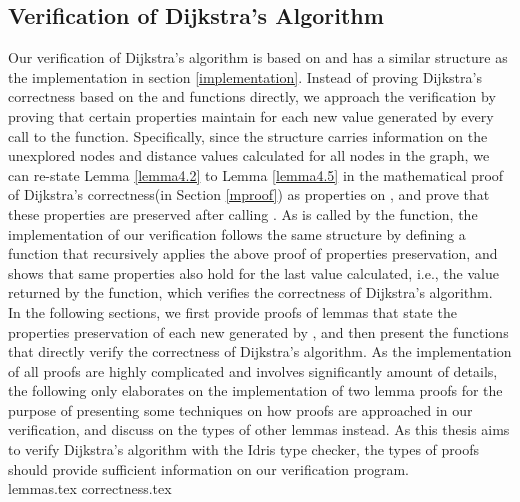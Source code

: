 \subsection{Verification of Dijkstra's Algorithm} \label{verification}
Our verification of Dijkstra's algorithm is based on and has a similar structure as the implementation in section \ref{implementation}. Instead of proving Dijkstra's correctness based on the  and  functions directly, we approach the verification by proving that certain properties maintain for each new  value generated by every call to the  function. Specifically, since the  structure carries information on the unexplored nodes and distance values calculated for all nodes in the graph, we can re-state Lemma \ref{lemma4.2} to Lemma \ref{lemma4.5} in the mathematical proof of Dijkstra's correctness(in Section \ref{mproof}) as properties on , and prove that these properties are preserved after calling . As  is called by the  function, the implementation of our verification follows the same structure by defining a function that recursively applies the above proof of properties preservation, and shows that same properties also hold for the last  value calculated, i.e., the value returned by the  function, which verifies the correctness of Dijkstra's algorithm. 
\\

In the following sections, we first provide proofs of lemmas that state the properties preservation of each new  generated by , and then present the functions that directly verify the correctness of Dijkstra's algorithm. As the implementation of all proofs are highly complicated and involves significantly amount of details, the following only elaborates on the implementation of two lemma proofs for the purpose of presenting some techniques on how proofs are approached in our verification, and discuss on the types of other lemmas instead. As this thesis aims to verify Dijkstra's algorithm with the Idris type checker, the types of proofs should provide sufficient information on our verification program.
\\

{lemmas.tex}
{correctness.tex}


